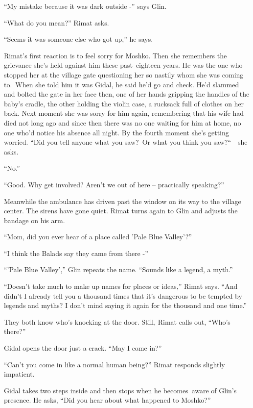 \documentclass[twoside,11pt]{book}
\begin{document}
``My mistake because it was dark outside -'' says Glin.

``What do you mean?'' Rimat asks. 

``Seems it was someone else who got up,'' he says. 

Rimat's first reaction is to feel sorry for Moshko. Then she remembers the grievance she's held against him these
past{\ }eighteen years. He was the one who stopped her at the village gate questioning her so nastily
whom she was coming to.\ When she told him it was Gidal, he said he'd go and check. He'd slammed and bolted the gate in
her face then, one of her hands gripping the handles of the baby's cradle, the other holding the violin case, a
rucksack full of clothes on her back. Next moment she was sorry for him again, remembering that  his wife had died not
long ago and since then there was no one waiting for him at home, no one who'd notice his absence all night. By the
fourth moment she's getting worried. ``Did you tell anyone what you saw?\ Or what you think you
saw?``\ \ she asks.

``No.''

``Good. Why get involved? Aren't we out of here -- practically speaking?'' 

Meanwhile the ambulance has driven past the window on its way to the village center. The sirens have gone quiet. Rimat
turns again to Glin and adjusts the bandage on his arm.

``Mom, did you ever hear of a place called 'Pale Blue Valley'?''

``I think the Balads say they came from there -'' 

``'Pale Blue Valley','' Glin repeats the name. ``Sounds like a legend, a
myth.'' 

``Doesn't take much to make up names for places or ideas,'' Rimat says. ``And
didn't I already tell you a thousand times that it's dangerous to be tempted by legends and myths? I don't mind saying
it again for the thousand and one time.'' 

They both know who's knocking at the door. Still, Rimat calls out, ``Who's there?''

Gidal opens the door just a crack. ``May I come in?'' 

``Can't you come in like a normal human being?'' Rimat responds slightly
impatient{.\ \ }

Gidal takes two steps inside and then stops when he becomes\ aware of Glin's presence. He asks, ``Did you
hear about what happened to Moshko?''
\end{document}
